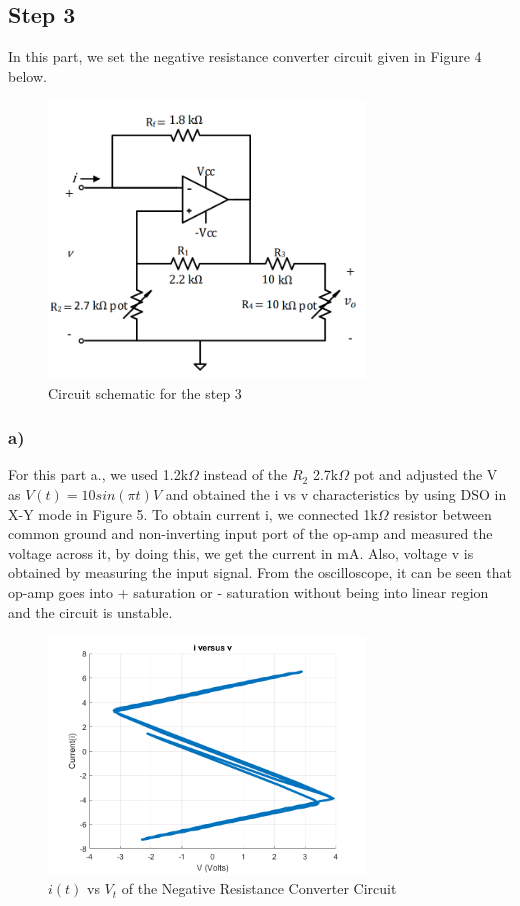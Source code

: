 \documentclass[letterpaper,12pt]{article}
\begin{document}
\subsection{Step 3}

In this part, we set the negative resistance converter circuit given in Figure 4 below.
\begin{figure}[H]
    \centering
    \includegraphics[width = 0.75\textwidth]{3SCH.png}
    \caption{Circuit schematic for the step 3}
\end{figure} 

  
\subsubsection{a)}
For this part a., we used 1.2k\(\Omega\) instead of the \(R_2\) 2.7k\(\Omega\) pot and adjusted the V as \(V(t) = 10sin(\pi t)V\) and obtained the i vs v characteristics by using DSO in X-Y mode in Figure 5. To obtain current i, we connected 1k\(\Omega\) resistor between common ground and non-inverting input port of the op-amp and measured the voltage across it, by doing this, we get the current in mA. Also, voltage v is obtained by measuring the input signal. From the oscilloscope, it can be seen that op-amp goes into + saturation or - saturation without being into linear region and the circuit is unstable.
\begin{figure}[H]
    \centering
    \includegraphics[width = 0.75\textwidth]{3a.png}
    \caption{\(i(t)\) vs \(V_{t}\) of the Negative Resistance Converter Circuit}
\end{figure} 
\end{document}
